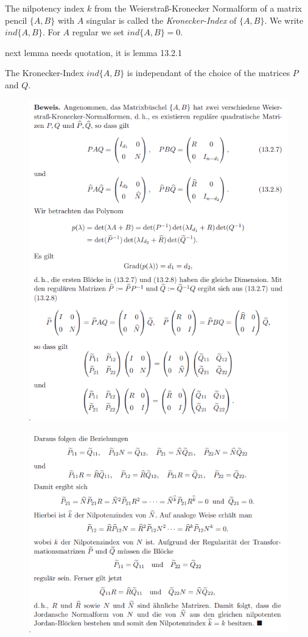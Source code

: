 \begin{definition}
	The nilpotency index $k$ from the Weierstraß-Kronecker Normalform of a matrix pencil $\{A,B\}$ with $A$ singular is called the \emph{Kronecker-Index} of $\{A,B\}$. We write $ind\{A,B\}$. For $A$ regular we set $ind\{A,B\} = 0$.
\end{definition}

next lemma needs quotation, it is lemma 13.2.1

\begin{lemma}
	The Kronecker-Index $ind\{A,B\}$ is independant of the choice of the matrices $P$ and $Q$.
\end{lemma}

\begin{figure}
	\centering
	\includegraphics[width=0.7\linewidth]{screenshot003}
	\caption{}
	\label{fig:screenshot003}
\end{figure}

\begin{figure}
	\centering
	\includegraphics[width=0.7\linewidth]{screenshot004}
	\caption{}
	\label{fig:screenshot004}
\end{figure}


